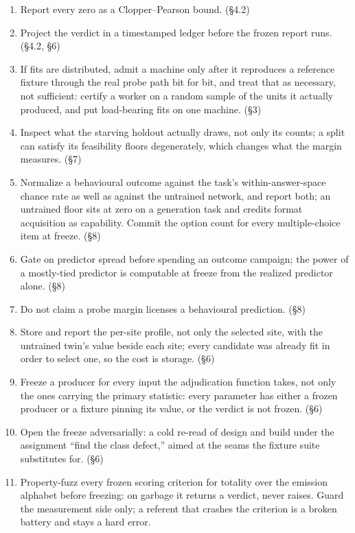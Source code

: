 \begin{enumerate}
  preregistered provision. (§6)
\item
  Report every zero as a Clopper--Pearson bound. (§4.2)
\item
  Project the verdict in a timestamped ledger before the frozen
  report runs. (§4.2, §6)
\item
  If fits are distributed, admit a machine only after it reproduces
  a reference fixture through the real probe path bit for bit, and
  treat that as necessary, not sufficient: certify a worker on a
  random sample of the units it actually produced, and put
  load-bearing fits on one machine. (§3)
\item
  Inspect what the starving holdout actually draws, not only its
  counts; a split can satisfy its feasibility floors degenerately,
  which changes what the margin measures. (§7)
\item
  Normalize a behavioural outcome against the task's
  within-answer-space chance rate as well as against the untrained
  network, and report both; an untrained floor sits at zero on a
  generation task and credits format acquisition as capability.
  Commit the option count for every multiple-choice item at freeze.
  (§8)
\item
  Gate on predictor spread before spending an outcome campaign; the
  power of a mostly-tied predictor is computable at freeze from the
  realized predictor alone. (§8)
\item
  Do not claim a probe margin licenses a behavioural prediction.
  (§8)
\item
  Store and report the per-site profile, not only the selected site,
  with the untrained twin's value beside each site; every candidate
  was already fit in order to select one, so the cost is storage.
  (§6)
\item
  Freeze a producer for every input the adjudication function takes,
  not only the ones carrying the primary statistic: every parameter
  has either a frozen producer or a fixture pinning its value, or
  the verdict is not frozen. (§6)
\item
  Open the freeze adversarially: a cold re-read of design and build
  under the assignment ``find the class defect,'' aimed at the seams
  the fixture suite substitutes for. (§6)
\item
  Property-fuzz every frozen scoring criterion for totality over the
  emission alphabet before freezing: on garbage it returns a verdict,
  never raises. Guard the measurement side only; a referent that
  crashes the criterion is a broken battery and stays a hard error.

\end{enumerate}
